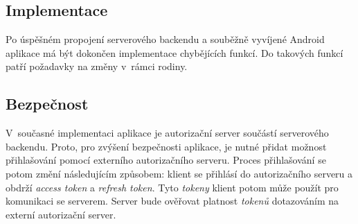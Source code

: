     \subsection{Implementace}
        Po úspěšném propojení serverového backendu a souběžně vyvíjené Android aplikace má být dokončen implementace chybějících funkcí. Do takových funkcí patří požadavky na změny v~rámci rodiny. 
        
    \subsection{Bezpečnost}
        V~současné implementaci aplikace je autorizační server součástí serverového backendu. Proto, pro zvýšení bezpečnosti aplikace, je nutné přidat možnost přihlašování pomocí externího autorizačního serveru. Proces přihlašování se potom změní následujícím způsobem: klient se přihlásí do autorizačního serveru a obdrží \textit{access token} a \textit{refresh token}. 
        Tyto \textit{tokeny} klient potom může použít pro komunikaci se serverem. Server bude ověřovat platnost \textit{tokenů} dotazováním na externí autorizační server.
